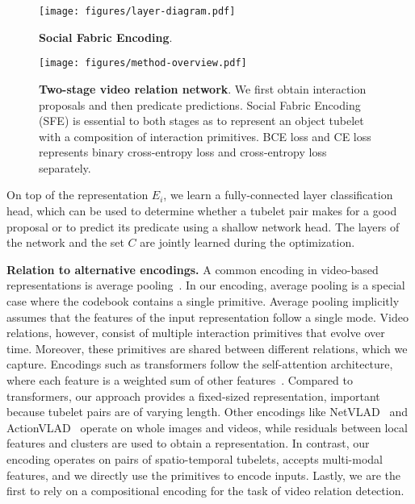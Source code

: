 \documentclass[10pt,twocolumn,letterpaper]{article}
\begin{document}
\begin{figure}[b!]
\centering
    \texttt{[image: figures/layer-diagram.pdf]}
    \vspace{-0.1cm}
  \caption{\textbf{Social Fabric Encoding}.
  }
\label{fig:SFE}
\end{figure}


\begin{figure*}[t]
\begin{center}
\texttt{[image: figures/method-overview.pdf]}
\end{center}
  \caption{
\textbf{Two-stage video relation network}. We first obtain interaction proposals and then predicate predictions. Social Fabric Encoding (SFE) is essential to both stages as to represent an object tubelet with a composition of interaction primitives. BCE loss and CE loss represents binary cross-entropy loss and cross-entropy loss separately.}
\label{fig:overview}
\end{figure*}


On top of the representation $E_i$, we learn a fully-connected layer classification head, which can be used to determine whether a tubelet pair makes for a good proposal or to predict its predicate using a shallow network head. The layers of the network and the set $C$ are jointly learned during the optimization. 

\textbf{Relation to alternative encodings.}
A common encoding in video-based representations is average pooling~\cite{yue2015beyond}. In our encoding, average pooling is a special case where the codebook contains a single primitive. Average pooling implicitly assumes that the features of the input representation follow a single mode. Video relations, however, consist of multiple interaction primitives that evolve over time. Moreover, these primitives are shared between different relations, which we capture.
Encodings such as transformers follow the self-attention architecture, where each feature is a weighted sum of other features~\cite{vaswani2017attention}. Compared to transformers, our approach provides a fixed-sized representation, important because tubelet pairs are of varying length. Other encodings like NetVLAD~\cite{arandjelovic2016netvlad} and ActionVLAD~\cite{girdhar2017actionvlad}   operate on whole images and videos, while residuals between local features and clusters are used to obtain a representation. In contrast, our encoding operates on pairs of spatio-temporal tubelets, accepts multi-modal features, and we directly use the primitives to encode inputs. Lastly, we are the first to rely on a compositional encoding for the task of video relation detection.
\end{document}
